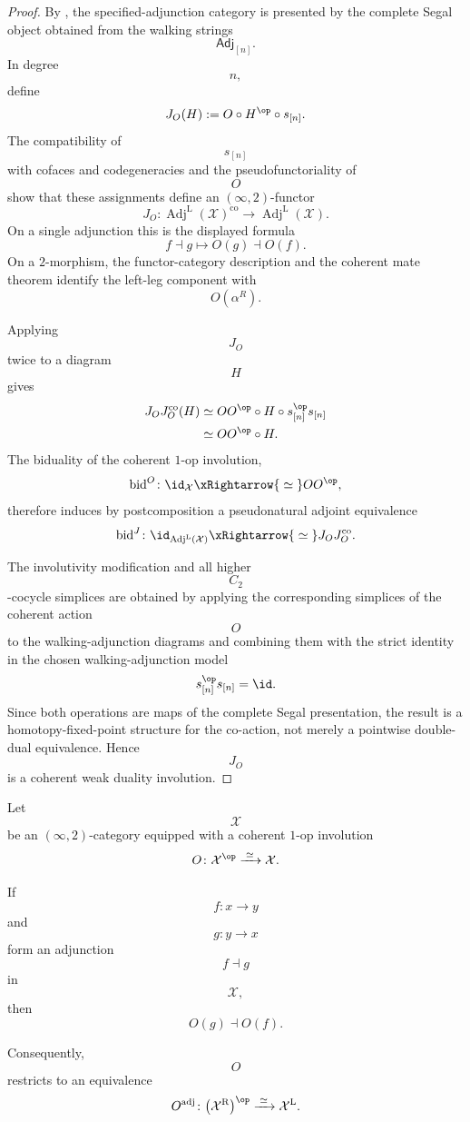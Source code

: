 \begin{proof}
By
, the specified-adjunction
category is presented by the complete Segal object obtained from the
walking strings
\[
    \mathsf{Adj}_{[n]}.
\]
In degree
\[
    n,
\]
define
\[
    J_O(H)
    :=
    O\circ H^{\op}\circ s_{[n]}.
\]
The compatibility of
\[
    s_{[n]}
\]
with cofaces and codegeneracies and the pseudofunctoriality of
\[
    O
\]
show that these assignments define an $(\infty,2)$-functor
\[
    J_O
    \colon
    \operatorname{Adj}^{\mathrm L}(\mathcal X)^{\mathrm{co}}
    \longrightarrow
    \operatorname{Adj}^{\mathrm L}(\mathcal X).
\]
On a single adjunction this is the displayed formula
\[
    f\dashv g
    \longmapsto
    O(g)\dashv O(f).
\]
On a $2$-morphism, the functor-category description and the coherent mate
theorem identify the left-leg component with
\[
    O(\alpha^R).
\]

Applying
\[
    J_O
\]
twice to a diagram
\[
    H
\]
gives
\[
\begin{aligned}
    J_OJ_O^{\mathrm{co}}(H)
    &\simeq
    O O^{\op}
    \circ
    H
    \circ
    s_{[n]}^{\op}s_{[n]}
    \\
    &\simeq
    O O^{\op}
    \circ
    H.
\end{aligned}
\]
The biduality of the coherent $1$-op involution,
\[
    \operatorname{bid}^{O}
    \colon
    \id_{\mathcal X}
    \xRightarrow{\;\simeq\;}
    O O^{\op},
\]
therefore induces by postcomposition a pseudonatural adjoint equivalence
\[
    \operatorname{bid}^{J}
    \colon
    \id_{\operatorname{Adj}^{\mathrm L}(\mathcal X)}
    \xRightarrow{\;\simeq\;}
    J_OJ_O^{\mathrm{co}}.
\]

The involutivity modification and all higher
\[
    C_2
\]
-cocycle simplices are obtained by applying the corresponding simplices
of the coherent action
\[
    O
\]
to the walking-adjunction diagrams and combining them with the strict
identity in the chosen walking-adjunction model
\[
    s_{[n]}^{\op}s_{[n]}
    =
    \id.
\]
Since both operations are maps of the complete Segal presentation, the
result is a homotopy-fixed-point structure for the co-action, not merely
a pointwise double-dual equivalence. Hence
\[
    J_O
\]
is a coherent weak duality involution.
\end{proof}

\begin{lemma}
\label{lem:one-op-reverses-adjunctions}
Let
\[
    \mathcal X
\]
be an $(\infty,2)$-category equipped with a coherent $1$-op involution
\[
    O
    \colon
    \mathcal X^{\op}
    \xrightarrow{\;\simeq\;}
    \mathcal X.
\]

If
\[
    f
    \colon
    x
    \longrightarrow
    y
\]
and
\[
    g
    \colon
    y
    \longrightarrow
    x
\]
form an adjunction
\[
    f\dashv g
\]
in
\[
    \mathcal X,
\]
then
\[
    O(g)\dashv O(f).
\]

Consequently,
\[
    O
\]
restricts to an equivalence
\[
    O^{\mathrm{adj}}
    \colon
    \bigl(
        \mathcal X^{\mathrm R}
    \bigr)^{\op}
    \xrightarrow{\;\simeq\;}
    \mathcal X^{\mathrm L}.
\]
\end{lemma}


